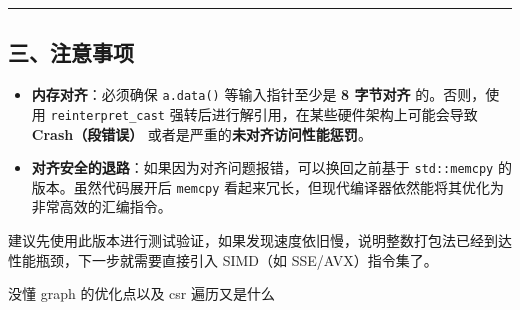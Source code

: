 \documentclass[11pt, a4paper]{article}
\begin{document}
\begin{aibox}
\begin{center}\rule{\textwidth}{0.4pt}\end{center}

\subsection*{三、注意事项}

\begin{itemize}
    \item \textbf{内存对齐}：必须确保 \texttt{a.data()} 等输入指针至少是 \textbf{8 字节对齐} 的。否则，使用 \texttt{reinterpret\_cast} 强转后进行解引用，在某些硬件架构上可能会导致 \textbf{Crash（段错误）} 或者是严重的\textbf{未对齐访问性能惩罚}。
    \item \textbf{对齐安全的退路}：如果因为对齐问题报错，可以换回之前基于 \texttt{std::memcpy} 的版本。虽然代码展开后 \texttt{memcpy} 看起来冗长，但现代编译器依然能将其优化为非常高效的汇编指令。
\end{itemize}

建议先使用此版本进行测试验证，如果发现速度依旧慢，说明整数打包法已经到达性能瓶颈，下一步就需要直接引入 SIMD（如 SSE/AVX）指令集了。
\end{aibox}

\vspace{1.5em}

\begin{userbox}
没懂 graph 的优化点以及 csr 遍历又是什么
\end{userbox}
\end{document}

